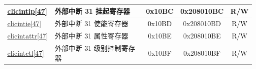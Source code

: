 \begin{longtable}{ | p{1.8cm} | p{7.5cm} | c | c | c | }
\hyperref[regdesc:MCLICINTIP_REG_i]{clicintip[47]} & 外部中断 31 挂起寄存器 & 0x10BC & 0x208010BC & R/W \\\hline
\hyperref[regdesc:MCLICINTIE_REG_i]{clicintie[47]} & 外部中断 31 使能寄存器 & 0x10BD & 0x208010BD & R/W \\\hline
\hyperref[regdesc:MCLICINTATTR_REG_i]{clicintattr[47]} & 外部中断 31 属性寄存器 & 0x10BE & 0x208010BE & R/W \\\hline
\hyperref[regdesc:MCLICINTCTL_REG_i]{clicintctl[47]} & 外部中断 31 级别控制寄存器 & 0x10BF & 0x208010BF & R/W \\\hline

\end{longtable}
